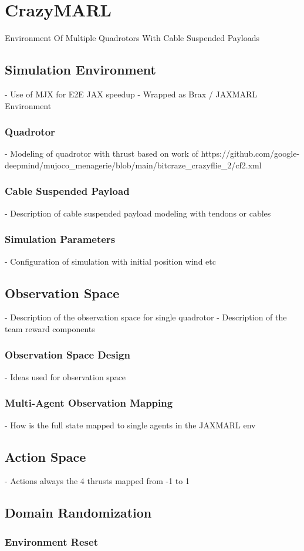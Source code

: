 \chapter{CrazyMARL}
Environment Of Multiple Quadrotors With Cable Suspended Payloads
\section{Simulation Environment}
- Use of MJX for E2E JAX speedup
- Wrapped as Brax / JAXMARL Environment

\subsection{Quadrotor}
- Modeling of quadrotor with thrust based on work of https://github.com/google-deepmind/mujoco_menagerie/blob/main/bitcraze_crazyflie_2/cf2.xml

\subsection{Cable Suspended Payload}
- Description of cable suspended payload modeling with tendons or cables
\subsection{Simulation Parameters}
- Configuration of simulation with initial position wind etc

\section{Observation Space}
- Description of the observation space for single quadrotor
- Description of the team reward components
\subsection{Observation Space Design}
- Ideas used for observation space
\subsection{Multi-Agent Observation Mapping}
- How is the full state mapped to single agents in the JAXMARL env

\section{Action Space}
- Actions always the 4 thrusts mapped from -1 to 1

\section{Domain Randomization}
\subsection{Environment Reset}

